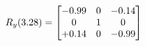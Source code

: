 \documentclass[preview]{standalone}
\begin{document}
\begin{align*}
\special{dvisvgm:raw <g id='unique000'>}R_{y}(3.28) = \begin{bmatrix}-0.99 & 0 & -0.14 \\0 & 1 & 0 \\+0.14 & 0 & -0.99\end{bmatrix}\special{dvisvgm:raw </g>}
\end{align*}
\end{document}
